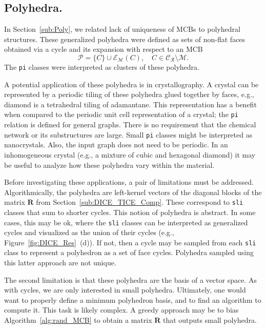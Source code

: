 \documentclass[fleqn,11pt]{article}
\newcommand\calM{\mathcal{M}}
\newcommand\calP{\mathcal{P}}     %
\newcommand\RelCyc{\mathcal{C_R}} %
\newcommand\expand[2]{\mathcal{E}_{#1}\left(#2\right)}   %
\begin{document}
%
%

\subsection{Polyhedra.} In Section~\ref{sub:Poly}, we related lack of uniqueness of MCBs to polyhedral structures. These generalized polyhedra were defined as sets of non-flat faces obtained via a cycle and its expansion with respect to an MCB
\begin{equation*}
	\calP=\{C\}\cup\expand{\calM}{C},\quad C\in\RelCyc\setminus\calM.
\end{equation*}
The {\tt pi} classes were interpreted as clusters of these polyhedra.

A potential application of these polyhedra is in crystallography. A crystal can be represented by a periodic tiling of these polyhedra glued together by faces, e.g., diamond is a tetrahedral tiling of adamantane. This representation has a benefit when compared to the periodic unit cell representation of a crystal; the {\tt pi} relation is defined for general graphs. There is no requirement that the chemical network or its substructures are large. Small {\tt pi} classes might be interpreted as nanocrystals. Also, the input graph does not need to be periodic. In an inhomogeneous crystal (e.g., a mixture of cubic and hexagonal diamond) it may be useful to analyze how these polyhedra vary within the material.

Before investigating these applications, a pair of limitations must be addressed. 
Algorithmically, the polyhedra are left-kernel vectors of the diagonal blocks of the matrix $\bm{R}$ from Section~\ref{sub:DICE_TICE_Comp}. These correspond to {\tt sli} classes that sum to shorter cycles. 
This notion of polyhedra is abstract.
In some cases, this may be ok, where the {\tt sli} classes can be interpreted as generalized cycles and visualized as the union of their cycles (e.g., Figure~\ref{fig:DICE_Res}~(d)). 
If not, then a cycle may be sampled from each {\tt sli} class to represent a polyhedron as a set of face cycles. Polyhedra sampled using this latter approach are not unique.

The second limitation is that these polyhedra are the basis of a vector space. As with cycles, we are only interested in small polyhedra. Ultimately, one would want to properly define a minimum polyhedron basis, and to find an algorithm to compute it. This task is likely complex. A greedy approach may be to bias Algorithm~\ref{alg:rand_MCB} to obtain a matrix $\bm{R}$ that outputs small polyhedra.
\end{document}
